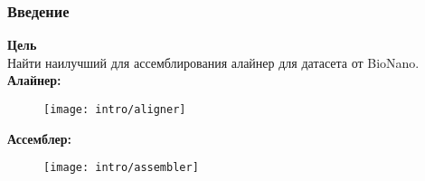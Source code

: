 \begin{frame}
\frametitle{Введение}
\textbf{Цель} \\
Найти наилучший для ассемблирования алайнер для датасета от BioNano.\\
\textbf{Алайнер:}
\begin{figure}
  \centering
  \texttt{[image: intro/aligner]}
\end{figure}
\textbf{Ассемблер:}
\begin{figure}
  \centering
  \texttt{[image: intro/assembler]}
\end{figure}


\end{frame}
